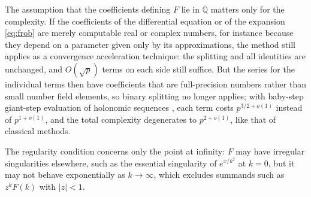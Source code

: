 \documentclass[11pt,reqno]{amsart}
\theoremstyle{definition}
\theoremstyle{remark}
\newcommand{\Qbar}{\overline{\mathbb{Q}}}
\begin{document}
The assumption that the coefficients defining $F$ lie in $\Qbar$
matters only for the complexity. If the coefficients of the differential equation or of the expansion \eqref{eq:frob} are merely computable real or
complex numbers, for instance because they depend on a parameter given only by its approximations, the method still
applies as a convergence acceleration technique: the splitting and all identities are unchanged, and $O(\sqrt p)$
terms on each side still suffice. But the series for the individual terms then have coefficients that are
full-precision numbers rather than small number field elements, so binary splitting no longer applies; with baby-step
giant-step evaluation of holonomic sequences \cite{BGS07,Joh14}, each term costs $p^{3/2+o(1)}$ instead of
$p^{1+o(1)}$, and the total complexity degenerates to $p^{2+o(1)}$, like that of classical methods.

The regularity condition concerns only the point
at infinity: $F$ may have irregular singularities elsewhere, such as the essential singularity of
$e^{x/k^2}$ at $k = 0$, but it may not behave exponentially as
$k \to \infty$, which excludes summands such as $z^kF(k)$ with $|z| < 1$.

\end{document}
